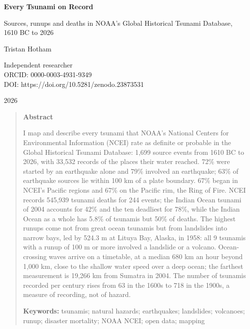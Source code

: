 \documentclass[11pt,a4paper]{article}
\begin{document}
\begin{center}
{\Large\bfseries Every Tsunami on Record\par}
\vspace{0.4em}
{\large Sources, runups and deaths in NOAA's Global Historical Tsunami Database,\\1610 BC to 2026\par}
\vspace{1.2em}
{\large Tristan Hotham\par}
\vspace{0.3em}
{\small Independent researcher\\
ORCID: 0000-0003-4931-9349\\
DOI: https://doi.org/10.5281/zenodo.23873531\par}
\vspace{0.8em}
2026
\end{center}

\begin{quote}
\small
\begin{center}\textbf{Abstract}\end{center}
I map and describe every tsunami that NOAA's National Centers for Environmental Information (NCEI) rate as definite or probable in the Global Historical Tsunami Database: 1,699 source events from 1610 BC to 2026, with 33,532 records of the places their water reached. 72\% were started by an earthquake alone and 79\% involved an earthquake; 63\% of earthquake sources lie within 100 km of a plate boundary. 67\% began in NCEI's Pacific regions and 67\% on the Pacific rim, the Ring of Fire. NCEI records 545,939 tsunami deaths for 244 events; the Indian Ocean tsunami of 2004 accounts for 42\% and the ten deadliest for 78\%, while the Indian Ocean as a whole has 5.8\% of tsunamis but 50\% of deaths. The highest runups come not from great ocean tsunamis but from landslides into narrow bays, led by 524.3 m at Lituya Bay, Alaska, in 1958: all 9 tsunamis with a runup of 100 m or more involved a landslide or a volcano. Ocean-crossing waves arrive on a timetable, at a median 680 km an hour beyond 1,000 km, close to the shallow water speed over a deep ocean; the farthest measurement is 19,266 km from Sumatra in 2004. The number of tsunamis recorded per century rises from 63 in the 1600s to 718 in the 1900s, a measure of recording, not of hazard.

\textbf{Keywords:} tsunamis; natural hazards; earthquakes; landslides; volcanoes; runup; disaster mortality; NOAA NCEI; open data; mapping
\end{quote}
\end{document}
